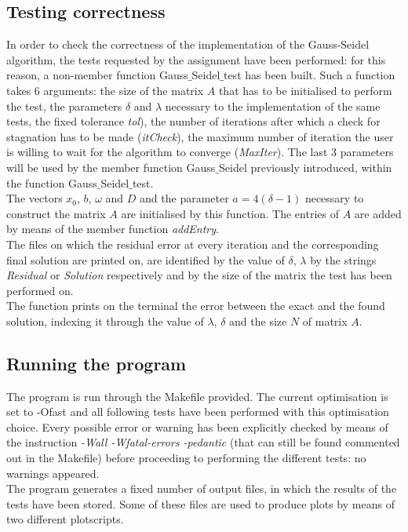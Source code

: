 \documentclass{article}
\theoremstyle{theorem}
\theoremstyle{definition}
\begin{document}
\subsection{Testing correctness}
In order to check the correctness of the implementation of the Gauss-Seidel algorithm, the tests requested by the assignment have been performed: for this reason, a non-member function Gauss$\_$Seidel$\_$test has been built. Such a function takes 6 arguments: the size of the matrix $A$ that has to be initialised to perform the test, the parameters $\delta$ and $\lambda$ necessary to the implementation of the same tests, the fixed tolerance \emph{tol}), the number of iterations after which a check for stagnation has to be made (\emph{itCheck}), the maximum number of iteration the user is willing to wait for the algorithm to converge (\emph{MaxIter}). The last 3 parameters will be used by the member function Gauss$\_$Seidel previously introduced, within the function Gauss$\_$Seidel$\_$test.\\
The vectors $x_0$, $b$, $\omega$ and $D$ and the parameter $a=4(\delta-1)$ necessary to construct the matrix $A$ are initialised by this function. The entries of $A$ are added by means of the member function \emph{addEntry}.\\
The files on which the residual error at every iteration and the corresponding final solution are printed on, are identified by the value of $\delta$, $\lambda$ by the strings \emph{Residual} or \emph{Solution} respectively and by the size of the matrix the test has been performed on.\\
The function prints on the terminal the error between the exact and the found solution, indexing it through the value of $\lambda$, $\delta$ and the size $N$ of matrix $A$.\\

\subsection{Running the program}
The program is run through the Makefile provided. The current optimisation is set to -Ofast and all following tests have been performed with this optimisation choice. Every possible error or warning has been explicitly checked by means of the instruction \emph{-Wall -Wfatal-errors -pedantic} (that can still be found commented out in the Makefile) before proceeding to performing the different tests: no warnings appeared.\\
The program generates a fixed number of output files, in which the results of the tests have been stored. Some of these files are used to produce plots by means of two different plotscripts.\\
\end{document}
